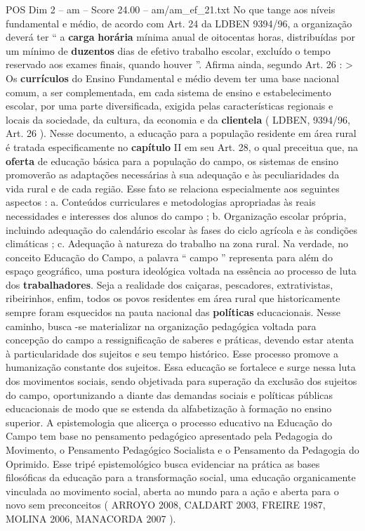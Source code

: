 \begin{textsample}{POS Dim 2 – am – Score 24.00 – am/am\_ef\_21.txt}
No que tange aos níveis fundamental e médio, de acordo com Art. 24 da LDBEN 9394/96, a organização deverá ter “ a \textbf{carga} \textbf{horária} mínima anual de oitocentas horas, distribuídas por um mínimo de \textbf{duzentos} dias de efetivo trabalho escolar, excluído o tempo reservado aos exames finais, quando houver ”.
Afirma ainda, segundo Art. 26 : > Os \textbf{currículos} do Ensino Fundamental e médio devem ter uma base nacional comum, a ser complementada, em cada sistema de ensino e estabelecimento escolar, por uma parte diversificada, exigida pelas características regionais e locais da sociedade, da cultura, da economia e da \textbf{clientela} ( LDBEN, 9394/96, Art. 26 ).
Nesse documento, a educação para a população residente em área rural é tratada especificamente no \textbf{capítulo} II em seu Art. 28, o qual preceitua que, na \textbf{oferta} de educação básica para a população do campo, os sistemas de ensino promoverão as adaptações necessárias à sua adequação e às peculiaridades da vida rural e de cada região.
Esse fato se relaciona especialmente aos seguintes aspectos : a.
Conteúdos curriculares e metodologias apropriadas às reais necessidades e interesses dos alunos do campo ; b.
Organização escolar própria, incluindo adequação do calendário escolar às fases do ciclo agrícola e às condições climáticas ; c.
Adequação à natureza do trabalho na zona rural.
Na verdade, no conceito Educação do Campo, a palavra “ campo ” representa para além do espaço geográfico, uma postura ideológica voltada na essência ao processo de luta dos \textbf{trabalhadores}.
Seja a realidade dos caiçaras, pescadores, extrativistas, ribeirinhos, enfim, todos os povos residentes em área rural que historicamente sempre foram esquecidos na pauta nacional das \textbf{políticas} educacionais.
Nesse caminho, busca -se materializar na organização pedagógica voltada para concepção do campo a ressignificação de saberes e práticas, devendo estar atenta à particularidade dos sujeitos e seu tempo histórico.
Esse processo promove a humanização constante dos sujeitos.
Essa educação se fortalece e surge nessa luta dos movimentos sociais, sendo objetivada para superação da exclusão dos sujeitos do campo, oportunizando a diante das demandas sociais e políticas públicas educacionais de modo que se estenda da alfabetização à formação no ensino superior.
A epistemologia que alicerça o processo educativo na Educação do Campo tem base no pensamento pedagógico apresentado pela Pedagogia do Movimento, o Pensamento Pedagógico Socialista e o Pensamento da Pedagogia do Oprimido.
Esse tripé epistemológico busca evidenciar na prática as bases filosóficas da educação para a transformação social, uma educação organicamente vinculada ao movimento social, aberta ao mundo para a ação e aberta para o novo sem preconceitos ( ARROYO 2008, CALDART 2003, FREIRE 1987, MOLINA 2006, MANACORDA 2007 ).

\end{textsample}
